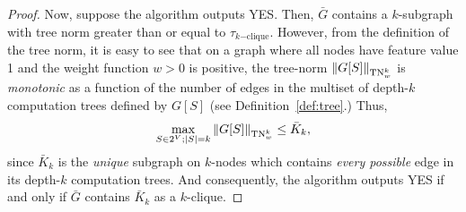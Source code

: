\begin{proof}
Now, suppose the algorithm outputs YES. Then, $\bar{G}$ contains a $k$-subgraph with tree norm greater than or equal to $\tau_{k\mathrm{-clique}}$. However, from the definition of the tree norm, it is easy to see that on a graph where all nodes have feature value 1 and the weight function $w > 0$ is positive, the tree-norm $\left\lVert G[S]\right\rVert_{\mathrm{TN}_w^k}$ is \emph{monotonic} as a function of the number of edges in the multiset of depth-$k$ computation trees defined by $G[S]$ (see Definition~\ref{def:tree}.) Thus, 
\begin{align*}
    \max_{S \in 2^V; \left\lvert S\right\rvert = k} \left\lVert G[S]\right\rVert_{\mathrm{TN}_w^k} \leq \bar{K}_k, 
\end{align*}
since $\bar{K}_k$ is the \emph{unique} subgraph on $k$-nodes which contains \emph{every possible} edge in its depth-$k$ computation trees. And consequently, the algorithm outputs YES if and only if $\bar{G}$ contains $\bar{K}_k$ as a $k$-clique.  
\end{proof}